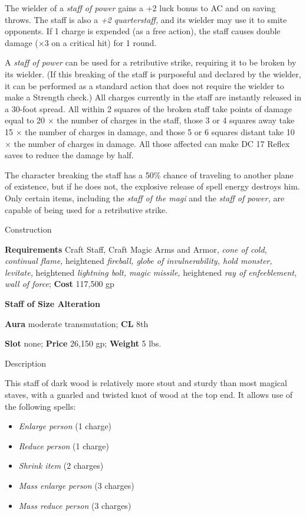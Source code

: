 The wielder of a \textit{staff of power }gains a +2 luck bonus to AC and on saving throws. The staff is also a \textit{+2 quarterstaff, }and its wielder may use it to smite opponents. If 1 charge is expended (as a free action), the staff causes double damage (\mbox{$\times$}3 on a critical hit) for 1 round.
				
A \textit{staff of power }can be used for a retributive strike, requiring it to be broken by its wielder. (If this breaking of the staff is purposeful and declared by the wielder, it can be performed as a standard action that does not require the wielder to make a Strength check.) All charges currently in the staff are instantly released in a 30-foot spread. All within 2 squares of the broken staff take points of damage equal to 20 \mbox{$\times$} the number of charges in the staff, those 3 or 4 squares away take 15 \mbox{$\times$} the number of charges in damage, and those 5 or 6 squares distant take 10 \mbox{$\times$} the number of charges in damage. All those affected can make DC 17 Reflex saves to reduce the damage by half.
				
The character breaking the staff has a 50\% chance of traveling to another plane of existence, but if he does not, the explosive release of spell energy destroys him. Only certain items, including the \textit{staff of the magi} and the \textit{staff of power, }are capable of being used for a retributive strike.
				
Construction
				
\textbf{Requirements }Craft Staff, Craft Magic Arms and Armor, \textit{cone of cold, continual flame, }heightened \textit{fireball, globe of invulnerability, hold monster, levitate, }heightened \textit{lightning bolt, magic missile, }heightened \textit{ray of enfeeblement, wall of force}; \textbf{Cost} 117,500 gp
				
\textbf{Staff of Size Alteration}
				
\textbf{Aura} moderate transmutation; \textbf{CL} 8th
				
\textbf{Slot }none; \textbf{Price} 26,150 gp; \textbf{Weight} 5 lbs.
				
Description
				
This staff of dark wood is relatively more stout and sturdy than most magical staves, with a gnarled and twisted knot of wood at the top end. It allows use of the following spells:
				\begin{itemize}\item  \textit{Enlarge person} (1 charge)
				\item  \textit{Reduce person} (1 charge)
				\item  \textit{Shrink item} (2 charges)
				\item  \textit{Mass enlarge person} (3 charges)
				\item  \textit{Mass reduce person} (3 charges)
\end{itemize}
				
